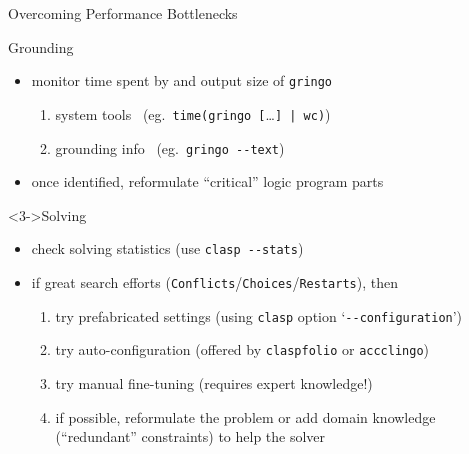 \begin{frame}{Overcoming Performance Bottlenecks}
\begin{block}{Grounding}
\vspace*{-2mm}
\begin{itemize}
\item monitor \alert{time} spent by and output \alert{size} of \lstinline{gringo}
  \begin{enumerate}
  \item system tools   \ (eg.\ \lstinline{time(gringo [}\dots{}\lstinline{] | wc)})
  \item grounding info \ (eg.\ \lstinline{gringo --text})
  \end{enumerate}
  \item<2-> once identified, \alert{reformulate} ``critical'' logic program parts
\end{itemize}
\end{block}
\begin{block}<3->{Solving}
\vspace*{-2mm}
\begin{itemize}
\item check solving statistics (use \alert{\lstinline{clasp --stats}})
\item<4-> if great search efforts (\alert{\lstinline{Conflicts}}/\lstinline{Choices}/\lstinline{Restarts}), then
  \begin{enumerate}
  \item<5-> try prefabricated settings (using \lstinline{clasp} option `\lstinline{--configuration}')
  \item<5-> try auto-configuration (offered by \lstinline{claspfolio} or \lstinline{accclingo})
  \item<5-> try manual fine-tuning (requires expert knowledge!)
  \item<6-> if possible, reformulate the problem or add domain knowledge
            (``redundant'' constraints) to help the solver
  \end{enumerate}
\end{itemize}
\end{block}
\end{frame}

